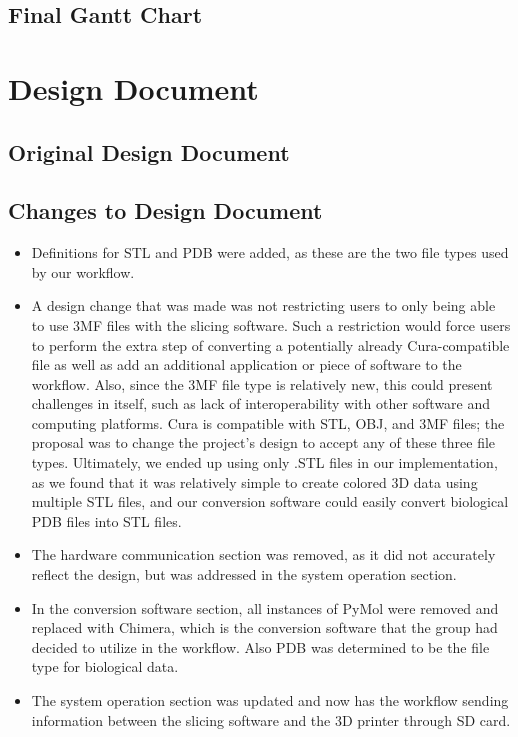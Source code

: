 \documentclass[letterpaper, onecolumn, draftclsnofoot, 10pt, compsoc]{IEEEtran}
\begin{document}
\begin{singlespace}
\subsection{Final Gantt Chart}


\section{Design Document}
\subsection{Original Design Document}

\subsection{Changes to Design Document} %
\begin{itemize}
\item Definitions for STL and PDB were added, as these are the two file types used by our workflow.
\item A design change that was made was not restricting users to only being able to use 3MF files with the slicing software.
Such a restriction would force users to perform the extra step of converting a potentially already Cura-compatible file as well as add an additional application or piece of software to the workflow.
Also, since the 3MF file type is relatively new, this could present challenges in itself, such as lack of interoperability with other software and computing platforms.
Cura is compatible with STL, OBJ, and 3MF files; the proposal was to change the project's design to accept any of these three file types.
Ultimately, we ended up using only .STL files in our implementation, as we found that it was relatively simple to create colored 3D data using multiple STL files, and our conversion software could easily convert biological PDB files into STL files.
\item  The hardware communication section was removed, as it did not accurately reflect the design, but was addressed in the system operation section.
\item In the conversion software section, all instances of PyMol were removed and replaced with Chimera, which is the conversion software that the group had decided to utilize in the workflow.
Also PDB was determined to be the file type for biological data.
\item The system operation section was updated and now has the workflow sending information between the slicing software and the 3D printer through SD card. 


\end{itemize}
\end{singlespace}
\end{document}
